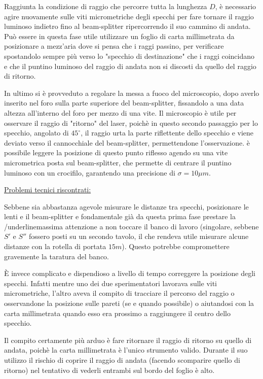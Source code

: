 \documentclass{article}
\begin{document}
\vspace{3mm}

Raggiunta la condizione di raggio che percorre tutta la lunghezza $D$, è necessario agire nuovamente sulle viti micrometriche degli specchi per fare tornare il raggio
luminoso indietro fino al beam-splitter ripercorrendo il suo cammino di andata. Può essere in questa fase utile utilizzare un foglio di carta millimetrata da posizionare
a mezz'aria dove si pensa che i raggi passino, per verificare spostandolo sempre più verso lo "specchio di destinazione" che i raggi coincidano e che il puntino luminoso
del raggio di andata non si discosti da quello del raggio di ritorno.

In ultimo si è provveduto a regolare la messa a fuoco del microscopio, dopo averlo inserito nel foro sulla parte superiore del beam-splitter, fissandolo a una data altezza
all'interno del foro per mezzo di una vite. Il microscopio è utile per osservare il raggio di "ritorno" del laser, poichè in questo secondo passaggio per lo specchio, 
angolato di $45^\circ$, il raggio urta la parte riflettente dello specchio e viene deviato verso il cannocchiale del beam-splitter, permettendone l'osservazione. è 
possibile leggere la posizione di questo punto riflesso agendo su una vite micrometrica posta sul beam-splitter, che permette di centrare il puntino luminoso con un 
crocifilo, garantendo una precisione di $\sigma = 10 \mu m$.

\vspace{3mm}

\underline{Problemi tecnici riscontrati:} 

Sebbene sia abbastanza agevole misurare le distanze tra specchi, posizionare le lenti e il beam-splitter e fondamentale già da questa prima fase prestare la 
/underline{massima attenzione} a non toccare il banco di lavoro (singolare, sebbene $S'$ e $S''$ fossero posti su un secondo tavolo, il che rendeva utile misurare alcune
distanze con la rotella di portata $15m$). 
Questo potrebbe compromettere gravemente la taratura del banco.

È invece complicato e dispendioso a livello di tempo correggere la posizione degli specchi. Infatti mentre uno dei due sperimentatori lavorava sulle viti micrometriche,
l'altro aveva il compito di tracciare il percorso del raggio o osservandone la posizione sulle pareti (se e quando possibile) o aiutandosi con la carta millimetrata 
quando esso era prossimo a raggiungere il centro dello specchio.

Il compito certamente più arduo è fare ritornare il raggio di ritorno su quello di andata, poichè la carta millimetrata è l'unico strumento valido. Durante il suo utilizzo
il rischio di coprire il raggio di andata (facendo scomparire quello di ritorno) nel tentativo di vederli entrambi sul bordo del foglio è alto.
\end{document}

